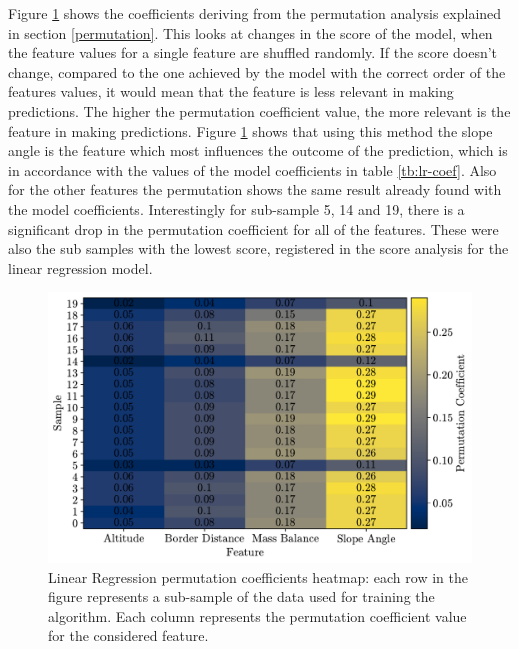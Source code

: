 Figure \ref{fig:lr-heatmap} shows the coefficients deriving from the permutation analysis explained in section \ref{permutation}. This looks at changes in the score of the model, when the feature values for a single feature are shuffled randomly. If the score doesn't change, compared to the one achieved by the model with the correct order of the features values, it would mean that the feature is less relevant in making predictions. The higher the permutation coefficient value, the more relevant is the feature in making predictions. Figure \ref{fig:lr-heatmap} shows that using this method the slope angle is the feature which most influences the outcome of the prediction, which is in accordance with the values of the model coefficients in table \ref{tb:lr-coef}. Also for the other features the permutation shows the same result already found with the model coefficients. Interestingly for sub-sample 5, 14 and 19, there is a significant drop in the permutation coefficient for all of the features. These were also the sub samples with the lowest score, registered in the score analysis for the linear regression model.

\begin{figure}[!tp]
	\centering		  
	\includegraphics[width=1.\textwidth]{figures/LR_heatmap.pdf}
	\caption{Linear Regression permutation coefficients heatmap: each row in the figure represents a sub-sample of the data used for training the algorithm. Each column represents the permutation coefficient value for the considered feature.}
	\label{fig:lr-heatmap}
\end{figure}

